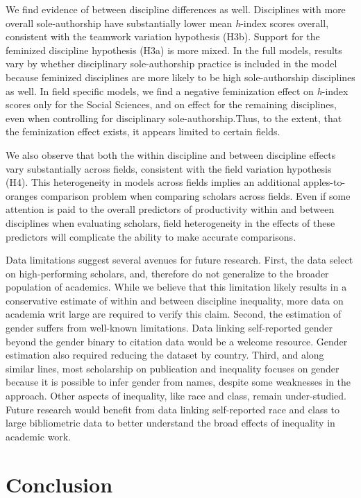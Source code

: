 \documentclass[
  10pt,
  letterpaper,
]{article}
\begin{document}
We find evidence of between discipline differences as well. Disciplines
with more overall sole-authorship have substantially lower mean
\emph{h}-index scores overall, consistent with the teamwork variation
hypothesis (H3b). Support for the feminized discipline hypothesis (H3a)
is more mixed. In the full models, results vary by whether disciplinary
sole-authorship practice is included in the model because feminized
disciplines are more likely to be high sole-authorship disciplines as
well. In field specific models, we find a negative feminization effect
on \emph{h}-index scores only for the Social Sciences, and on effect for
the remaining disciplines, even when controlling for disciplinary
sole-authorship.Thus, to the extent, that the feminization effect
exists, it appears limited to certain fields.

We also observe that both the within discipline and between discipline
effects vary substantially across fields, consistent with the field
variation hypothesis (H4). This heterogeneity in models across fields
implies an additional apples-to-oranges comparison problem when
comparing scholars across fields. Even if some attention is paid to the
overall predictors of productivity within and between disciplines when
evaluating scholars, field heterogeneity in the effects of these
predictors will complicate the ability to make accurate comparisons.

Data limitations suggest several avenues for future research. First, the
data select on high-performing scholars, and, therefore do not
generalize to the broader population of academics. While we believe that
this limitation likely results in a conservative estimate of within and
between discipline inequality, more data on academia writ large are
required to verify this claim. Second, the estimation of gender suffers
from well-known limitations. Data linking self-reported gender beyond
the gender binary to citation data would be a welcome resource. Gender
estimation also required reducing the dataset by country. Third, and
along similar lines, most scholarship on publication and inequality
focuses on gender because it is possible to infer gender from names,
despite some weaknesses in the approach. Other aspects of inequality,
like race and class, remain under-studied. Future research would benefit
from data linking self-reported race and class to large bibliometric
data to better understand the broad effects of inequality in academic
work.

\section{Conclusion}\label{conclusion}
\end{document}
